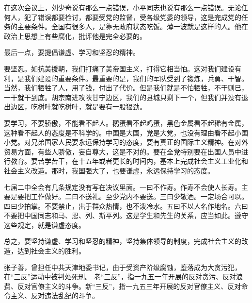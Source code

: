 在这次会议上，刘少奇说有那么一点错误，小平同志也说有那么一点错误。无论任何人，犯了错误都要检讨，都要受党的监督，受各级党委的领导，这是完成党的任务的主要条件。全国有很多人，是靠无政府状态吃饭。薄一波就是这样的人。他在政治上思想上有些腐化，批评他是完全必要的。

最后一点，要提倡谦虚、学习和坚忍的精神。

要坚忍。如抗美援朝，我们打痛了美帝国主义，打得它相当怕。这对我们建设有利，是我们建设的重要条件。最重要的是，我们的军队受到了锻炼，兵勇、干智。当然，我们牺牲了人，用了钱，付出了代价。但是我们就是不怕牺牲，不干则已，一干就干到底。胡宗南进攻陕甘宁边区，我们的县城只剩下一个，但我们并没有退出边区，吃树叶就吃树叶，就是要有一股狠劲。

要学习，不要骄傲，不能看不起人。鹅蛋看不起鸡蛋，黑色金属看不起稀有金属，这种看不起人的态度是不科学的。中国是大国，党是大党，也没有理由看不起小国小党。对兄弟国家人民要永远保持学习的态度，要有真正的国际主义精神。在对外贸易方面，有些人骄傲，妄自尊大，这是不对的。要在全党特别要在出国人员中进行教育。要苦学苦干，在十五年或者更长的时间内，基本上完成社会主义工业化和社会主义改造。那时，我国强大了，也要谦虚，永远保持学习的态度。

七届二中全会有几条规定没有写在决议里面。一曰不作寿。作寿不会使人长寿。主要是要把工作做好。二曰不送礼。至少党内不要送。三曰少敬酒。一定场合可以。四曰少拍掌。不要禁止，出于群众热情，也不泼冷水。五曰不以人名作地名。六曰不要把中国同志和马、恩、列、斯平列。这是学生和先生的关系，应当如此。遵守这些规定，就是谦虚态度。

总之，要坚持谦虚、学习和坚忍的精神，坚持集体领导的制度，完成社会主义的改造，达到社会主义的胜利。


\begin{maonote}
张子善，曾担任中共天津地委书记，由于受资产阶级腐蚀，堕落成为大贪污犯，在“三反”运动中被判处死刑。
老“三反”，指一九五一年开展的反对贪污、反对浪费、反对官僚主义的斗争。新“三反”，指一九五三年开展的反对官僚主义、反对命令主义、反对违法乱纪的斗争。
\end{maonote}
